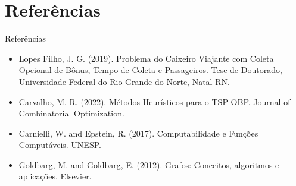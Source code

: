 \documentclass[aspectratio=169,xcolor=table]{beamer}
\begin{document}
\section{Referências}

\begin{frame}{Referências}
    \begin{itemize}
        \item Lopes Filho, J. G. (2019). Problema do Caixeiro Viajante com Coleta Opcional de Bônus, Tempo de Coleta e Passageiros. Tese de Doutorado, Universidade Federal do Rio Grande do Norte, Natal-RN.
        \item Carvalho, M. R. (2022). Métodos Heurísticos para o TSP-OBP. Journal of Combinatorial Optimization.
        \item Carnielli, W. and Epstein, R. (2017). Computabilidade e Funções Computáveis. UNESP.
        \item Goldbarg, M. and Goldbarg, E. (2012). Grafos: Conceitos, algoritmos e aplicações. Elsevier.
    \end{itemize}
\end{frame}
\end{document}
